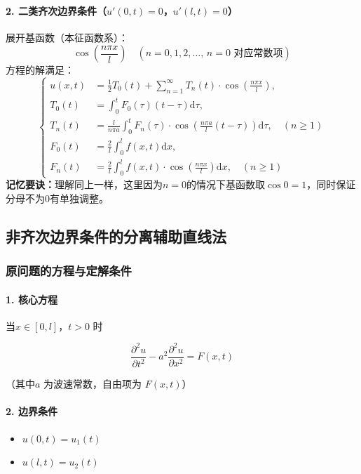 \documentclass{article}
\begin{document}
	\paragraph{2. 二类齐次边界条件（$ u'(0,t)=0 $，$ u'(l,t)=0 $）}
	展开基函数（本征函数系）：
	\[
	\cos\left( \frac{n \pi x}{l} \right) \quad (n=0,1,2,\dots, \, n=0 \text{ 对应常数项})
	\]
	方程的解满足：
	\[
	\left\{
	\begin{aligned}
		u(x, t) &= \frac{1}{2}T_0(t) + \sum_{n=1}^{\infty} T_n(t) \cdot \cos\left( \frac{n \pi x}{l} \right), \\
		T_0(t) &= \int_{0}^{t} F_0(\tau) (t - \tau) \mathrm{d}\tau, \\
		T_n(t) &= \frac{l}{n \pi a} \int_{0}^{t} F_n(\tau) \cdot \cos\left( \frac{n \pi a}{l} (t - \tau) \right) \mathrm{d}\tau, \quad (n \geq 1) \\
		F_0(t) &= \frac{2}{l} \int_{0}^{l} f(x, t) \mathrm{d}x, \\
		F_n(t) &= \frac{2}{l} \int_{0}^{l} f(x, t) \cdot \cos\left( \frac{n \pi x}{l} \right) \mathrm{d}x, \quad (n \geq 1)
	\end{aligned}
	\right.
	\]
	\textbf{记忆要诀：}理解同上一样，这里因为$n = 0$的情况下基函数取$\cos0 = 1$，同时保证分母不为$0$有单独调整。
	\subsection{非齐次边界条件的分离辅助直线法}
	
	\subsubsection{原问题的方程与定解条件}
	
	\paragraph{1. 核心方程}
	当$ x \in [0, l] $，$ t > 0 $ 时
	
	$$ \frac{\partial^2 u}{\partial t^2} - a^2 \frac{\partial^2 u}{\partial x^2} = F(x, t) $$
	
	（其中$ a $ 为波速常数，自由项为 $ F(x, t) $）
	
	\paragraph{2. 边界条件}
	\begin{itemize}
		\item $ u(0, t) = u_1(t) $
		\item $ u(l, t) = u_2(t) $
		
	\end{itemize}
	
\end{document}
